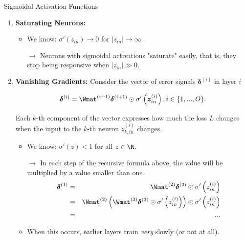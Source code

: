 \begin{vbframe}{Sigmoidal Activation Functions}

\begin{enumerate}
  \item \textbf{Saturating Neurons:}
  \begin{itemize}
    \item We know: $\sigma'\left(z_{in}\right) \to 0$ for $|z_{in}| \to \infty$. 
    \item[$\to$] Neurons with sigmoidal activations "saturate" easily, that is, they stop being responsive when $|z_{in}| \gg 0$. 
  \end{itemize}

  \framebreak 

  \item \textbf{Vanishing Gradients: } Consider the vector of error signals $\bm{\delta}^{(i)}$ in layer $i$ 

    $$
      \bm{\delta}^{(i)} = \Wmat^{(i + 1)} \bm{\delta}^{(i + 1)} \odot \sigma'\left(\bm{z}_{in}^{(i)}\right), i \in\{ 1, ..., O\}. 
    $$

    Each $k$-th component of the vector expresses how much the loss $L$ changes when the input to the $k$-th neuron $z_{k, in}^{(i)}$ changes. 
    \begin{itemize}
      \item We know: $\sigma'\left(z\right)< 1$ for all $z \in \R$. 
      \item[$\to$] In each step of the recursive formula above, the value will be multiplied by a value smaller than one
      \begin{eqnarray*}
        \bm{\delta}^{(1)} &=& \Wmat^{(2)} \bm{\delta}^{(2)} \odot \sigma'\left(z_{in}^{(i)}\right) \\
        &=& \Wmat^{(2)} \left(\Wmat^{(3)} \bm{\delta}^{(3)} \odot \sigma'\left(z_{in}^{(i)}\right)\right) \odot \sigma'\left(z_{in}^{(i)}\right) \\
        &=& ...
      \end{eqnarray*}
      \item When this occurs, earlier layers train \emph{very} slowly (or not at all).
    \end{itemize}
\end{enumerate}

\end{vbframe}


